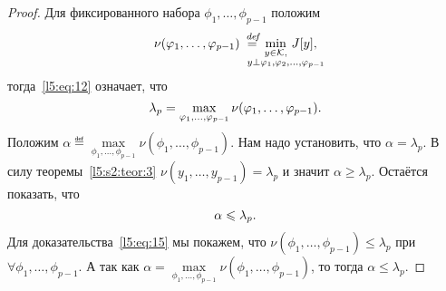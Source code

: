 \begin{proof}
	Для фиксированного набора $\phi_1,\ldots,\phi_{p-1}$ положим
	\begin{equation}
		\label{l5:eq:13}
		\hfill\nu(\phi_1,\ldots,\phi_{p-1})\eqdef\min\limits_{\substack{y\in\K,\\\lefteqn{\scriptstyle \hspace*{-0.8cm}y\perp\phi_1,\phi_2,\ldots,\phi_{p-1}}}}\,J[y],\hfill
	\end{equation}
	тогда~\eqref{l5:eq:12} означает, что
	\begin{equation}
		\label{l5:eq:14}
		\hfill\lambda_p=\max\limits_{\phi_1,\ldots,\phi_{p-1}}\nu(\phi_1,\ldots,\phi_{p-1}).\hfill
	\end{equation}
	Положим $\displaystyle\alpha\eqdef\max\limits_{\phi_1,\ldots,\phi_{p-1}}\nu(\phi_1,\ldots,\phi_{p-1})$. Нам надо установить, что $\alpha=\lambda_p$. В силу теоремы~\ref{l5:s2:teor:3} $\nu(y_1,\ldots,y_{p-1})=\lambda_p$ и значит $\alpha\geqslant\lambda_p$. Остаётся показать, что
	\begin{equation}
		\label{l5:eq:15}
		\hfill\alpha\leqslant\lambda_p.\hfill
	\end{equation} 
	Для доказательства~\eqref{l5:eq:15} мы покажем, что $\nu(\phi_1,\ldots,\phi_{p-1})\leqslant\lambda_p$ при $\forall\phi_1,\ldots,\phi_{p-1}$. А так как $\alpha=\max\limits_{\phi_1,\ldots,\phi_{p-1}}\nu(\phi_1,\ldots,\phi_{p-1})$, то тогда $\alpha\leqslant\lambda_p$.
	

\end{proof}

